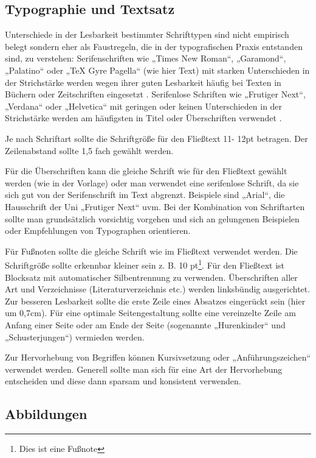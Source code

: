 \subsection{Typographie und Textsatz}\label{subsubsec:typographie}

Unterschiede in der Lesbarkeit bestimmter Schrifttypen sind nicht empirisch belegt sondern eher als Faustregeln, die in der typografischen Praxis entstanden sind, zu verstehen:  Serifenschriften wie „Times New Roman“, „Garamond“, „Palatino“ oder „TeX Gyre Pagella“ (wie hier Text)  mit starken Unterschieden in der Strichstärke werden wegen ihrer guten Lesbarkeit häufig bei Texten in Büchern oder Zeitschriften eingesetzt \cite[S.18]{gotz2004typo}.
Serifenlose Schriften wie „Frutiger Next“, „Verdana“ oder „Helvetica“ mit geringen oder keinen Unterschieden in der Strichstärke werden am häufigsten in Titel oder Überschriften verwendet \cite[S.18]{gotz2004typo}. 

  Je nach Schriftart sollte die Schriftgröße für den Fließtext 11- 12pt betragen. Der Zeilenabstand sollte 1,5 fach gewählt werden.

Für die Überschriften kann die gleiche Schrift wie für den Fließtext gewählt werden (wie in der Vorlage) oder man verwendet eine serifenlose Schrift, da sie sich gut von der Serifenschrift im Text abgrenzt.
Beispiele sind „Arial“, die Hausschrift der Uni „Frutiger Next“ uvm.
Bei der Kombination von Schriftarten sollte man grundsätzlich vorsichtig vorgehen und sich an gelungenen Beispielen oder Empfehlungen von Typographen orientieren. 

Für Fußnoten sollte die gleiche Schrift wie im Fließtext verwendet werden. Die Schriftgröße sollte erkennbar kleiner sein z. B. 10 pt\footnote{Dies ist eine Fußnote}.
Für den Fließtext ist Blocksatz mit automatischer Silbentrennung zu verwenden.
Überschriften aller Art und Verzeichnisse (Literaturverzeichnis etc.) werden linksbündig ausgerichtet.
Zur besseren Lesbarkeit sollte die erste Zeile eines Absatzes eingerückt sein (hier um 0,7cm).
Für eine optimale Seitengestaltung sollte eine vereinzelte Zeile am Anfang einer Seite oder am Ende der Seite (sogenannte „Hurenkinder“ und „Schusterjungen“) vermieden werden.

Zur Hervorhebung von Begriffen können Kursivsetzung oder „Anführungszeichen“ verwendet werden.
Generell sollte man sich für eine Art der Hervorhebung entscheiden und diese dann sparsam und  konsistent verwenden. 

\subsection{Abbildungen}\label{subsubsec:abbildungen}

